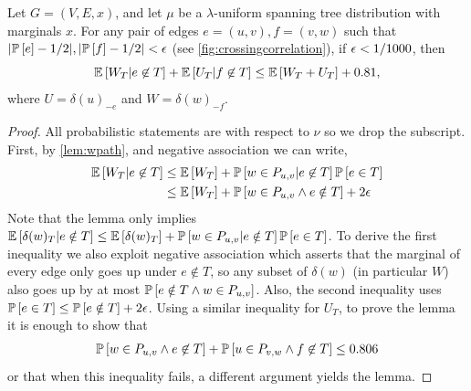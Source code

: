 \begin{lemma}\label{lem:crossingcorrelation}
Let \hyperlink{tar:G=(V,E,x)}{$G=(V,E,x)$}, and let $\mu$ be a $\lambda$-uniform spanning tree distribution with marginals $x$. 
For any pair of edges  $e=(u,v), f=(v,w)$ such that $|\P{e}-1/2|,|\P{f}-1/2|<\eps$ (see \cref{fig:crossingcorrelation}), if $\eps<1/1000$, then
$$\E{W_T | e\not\in T}+\E{U_T | f\not\in T}\leq \E{W_T+U_T}+0.81,$$
where $U=\delta(u)_{-e}$ and $W=\delta(w)_{-f}$.
\end{lemma}
\begin{proof}
All probabilistic statements are with respect to $\nu$ so we drop the subscript.
First, by \cref{lem:wpath}, and negative association we can write,
	\begin{align*}
		\E{W_T |e \not\in T} &\le \E{W_T} + \P{w \in P_{u,v}|e \not\in T}\P{e\in T}\\
		&\le \E{W_T} + \P{w\in P_{u,v}\wedge e\notin T} + 2\eps
	\end{align*}
	Note that the lemma only implies  $\E{\delta(w)_T|e\notin T}\leq \E{\delta(w)_T}+\P{w\in P_{u,v}| e\notin T }\P{e\in T}$. To derive the first inequality we also exploit negative association which asserts that the marginal of every edge only goes up under $e\notin T$, so any subset of $\delta(w)$ (in particular $W$) also goes up by at most $\P{e\notin T\wedge w\in P_{u,v}}$.
	Also, the second inequality uses $\P{e\in T} \leq \P{e\notin T} + 2\eps$.
	Using a similar inequality for $U_T$, to prove the lemma it is enough to show that
	\begin{align*}
		\P{w \in P_{u,v} \wedge e \not\in T}
		+\P{u \in P_{v,w} \wedge f \not\in T} \leq 0.806
	\end{align*}
	or that when this inequality fails, a different argument yields the lemma. 
	

\end{proof}
